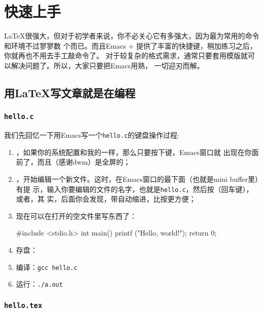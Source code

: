 \chapter{快速上手}

\LaTeX{}很强大，但对于初学者来说，你不必关心它有多强大，因为最为常用的命令和环境不过寥寥数
个而已。而且Emacs \(+\) \auctex{}提供了丰富的快捷键，稍加练习之后，你就再也不用去手工敲命令了。
对于较复杂的格式需求，通常只要套用模版就可以解决问题了。所以，大家只要把Emacs用熟，
一切迎刃而解。

\section{用LaTeX写文章就是在编程}
\label{sec:hello}

\subsection{\texttt{hello.c}}
\label{sec:hello.c}

我们先回忆一下用Emacs写一个\texttt{hello.c}的键盘操作过程:

\begin{enumerate}
\item {}，如果你的系统配置和我的一样，那么只要按下键，Emacs窗口就
  出现在你面前了，而且（感谢dwm）是全屏的；
\item {}，开始编辑一个新文件。这时，在Emacs窗口的最下面（也就是mini buffer里）有提
  示，输入你要编辑的文件的名字，也就是\texttt{hello.c}，然后按\LKeyEnter{}（回车键），或者，其
  实，后面你会发现，带自动缩进，比按\LKeyEnter{}更方便；
\item 现在可以在打开的空文件里写东西了：
  \begin{codeblock}[.7]
\begin{ccode}
#include <stdio.h>
int main()
{
  printf ("Hello, world!\n");
  return 0;
}
\end{ccode}
  \end{codeblock}
\item 存盘：
\item 编译：\texttt{gcc hello.c}
\item 运行：\texttt{./a.out}
\end{enumerate}

\subsection{\texttt{hello.tex}}
\label{sec:hello.tex}

